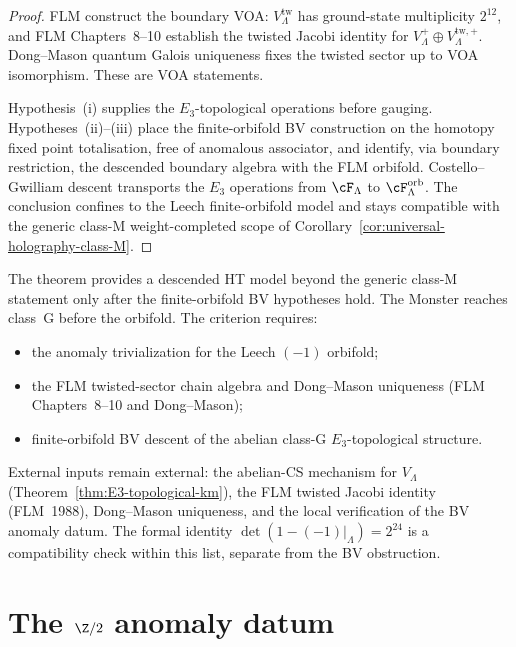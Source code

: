 \begin{proof}
FLM construct the boundary VOA:
$V_\Lambda^{\mathrm{tw}}$ has ground-state multiplicity $2^{12}$, and
FLM Chapters~8--10 establish the twisted Jacobi identity for
$V_\Lambda^+\oplus V_\Lambda^{\mathrm{tw},+}$. Dong--Mason quantum
Galois uniqueness fixes the twisted sector up to VOA isomorphism.
These are VOA statements.

Hypothesis~(i) supplies the $E_3$-topological operations before
gauging. Hypotheses~(ii)--(iii) place the finite-orbifold BV
construction on the homotopy fixed point totalisation, free of
anomalous associator, and identify, via boundary restriction, the
descended boundary algebra with the FLM orbifold.
Costello--Gwilliam descent transports the $E_3$ operations from
$\cF_\Lambda$ to $\cF_\Lambda^{\mathrm{orb}}$. The conclusion confines
to the Leech finite-orbifold model and stays compatible with the
generic class-M weight-completed scope of
Corollary~\ref*{cor:universal-holography-class-M}.
\end{proof}

\begin{remark}
\label{rem:monster-orbifold-scope}
The theorem provides a descended HT model beyond the generic class-M
statement only after the finite-orbifold BV hypotheses hold. The
Monster reaches class~G before the orbifold. The criterion requires:
\begin{itemize}
\item the anomaly trivialization for the Leech $(-1)$ orbifold;
\item the FLM twisted-sector chain algebra and Dong--Mason uniqueness
 (FLM Chapters~8--10 and Dong--Mason);
\item finite-orbifold BV descent of the abelian class-G
 $E_3$-topological structure.
\end{itemize}
External inputs remain external: the abelian-CS mechanism for
$V_\Lambda$ (Theorem~\ref*{thm:E3-topological-km}), the FLM twisted
Jacobi identity (FLM~1988), Dong--Mason uniqueness, and the local
verification of the BV anomaly datum. The formal
identity $\det(1-(-1)|_\Lambda)=2^{24}$ is a compatibility check
within this list, separate from the BV obstruction.
\end{remark}

\section{The $\Z/2$ anomaly datum}
\label{sec:monster-anomaly-class-explicit}

